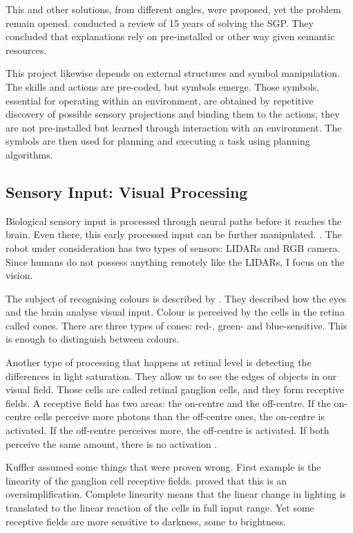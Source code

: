 This and other solutions, from different angles, were proposed, yet the problem remain opened. \textcite{taddeo2005solving} conducted a review of 15 years of solving the SGP. They concluded that explanations rely on pre-installed or other way given semantic resources. 

This project likewise depends on external structures and symbol manipulation. The skills and actions are pre-coded, but symbols emerge. Those symbols, essential for operating within an environment, are obtained by repetitive discovery of possible sensory projections and binding them to the actions, they are not pre-installed but learned through interaction with an environment. The symbols are then used for planning and executing a task using planning algorithms.

\subsection{Sensory Input: Visual Processing} \label{chapter:theory:visuals}
Biological sensory input is processed through neural paths before it reaches the brain. Even there, this early processed input can be further manipulated. \parencite{crick2003framework}. The robot under consideration has two types of sensors: LIDARs and RGB camera. Since humans do not possess anything remotely like the LIDARs, I focus on the vision.

The subject of recognising colours is described by \textcite{livingstone1988segregation}. They described how the eyes and the brain analyse visual input. Colour is perceived by the cells in the retina called cones. There are three types of cones: red-, green- and blue-sensitive. This is enough to distinguish between colours. 

Another type of processing that happens at retinal level is detecting the differences in light saturation. They allow us to see the edges of objects in our visual field. Those cells are called retinal ganglion cells, and they form receptive fields. A receptive field has two areas: the on-centre and the off-centre. If the on-centre cells perceive more photons than the off-centre ones, the on-centre is activated. If the off-centre perceives more, the off-centre is activated. If both perceive the same amount, there is no activation \parencite{kuffler1953discharge}.

Kuffler assumed some things that were proven wrong. First example is the linearity of the ganglion cell receptive fields. \textcite{enroth1966contrast} proved that this is an oversimplification. Complete linearity means that the linear change in lighting is translated to the linear reaction of the cells in full input range. Yet some receptive fields are more sensitive to darkness, some to brightness. 

